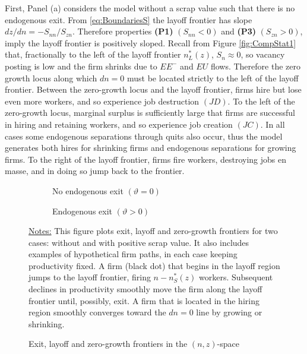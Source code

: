 First, Panel (a) considers the model without a scrap value such that there is no endogenous exit.
From  \eqref{eq:BoundariesS} the layoff frontier has slope ${dz}/{dn} = -{S_{nn}}/{S_{zn}}$.
Therefore properties \textbf{(P1)} $(S_{nn}<0)$ and \textbf{(P3)} $(S_{zn}>0)$, imply the layoff frontier is positively sloped.
Recall from Figure \ref{fig:CompStat1} that, fractionally to the left of the layoff frontier $n^\ast_L(z)$, $S_n\approx 0$, so vacancy posting is low and the firm shrinks due to $EE^{-}$ and $EU$ flows.
Therefore the zero growth locus along which $dn=0$ must be located strictly to the left of the layoff frontier.
Between the zero-growth locus and the layoff frontier, firms hire but lose even more workers, and so experience job destruction $(JD)$.
To the left of the zero-growth locus, marginal surplus is sufficiently large that firms are successful in hiring and retaining workers, and so experience job creation $(JC)$.
In all cases some endogenous separations through quits also occur, thus the model generates both hires for shrinking firms and endogenous separations for growing firms.
To the right of the layoff frontier, firms fire workers, destroying jobs en masse, and in doing so jump back to the frontier.

\begin{figure}[ttt]
\begin{center}
\begin{subfigure}{0.33\textwidth}
\scalebox{0.75}{}
\caption{No endogenous exit $(\vartheta=0)$}
\end{subfigure}
\hspace{1cm}
\begin{subfigure}{0.33\textwidth}
\scalebox{0.75}{}
\caption{Endogenous exit $(\vartheta>0)$}
\end{subfigure}
\caption{Exit, layoff and zero-growth frontiers in the $(n,z)$-space}\label{fig:CompStat3}
\vspace*{-.3cm}
\end{center}
{\footnotesize{
\underline{Notes:}
This figure plots exit, layoff and zero-growth frontiers for two cases: without and with positive scrap value.
It also includes examples of hypothetical firm paths, in each case keeping productivity fixed.
A firm (black dot) that begins in the layoff region jumps to the layoff frontier, firing $n-n^\ast_{S}(z)$ workers.
Subsequent declines in productivity smoothly move the firm along the layoff frontier until, possibly, exit.
A firm that is located in the hiring region smoothly converges toward the $dn=0$ line by growing or shrinking.}}
\end{figure}

